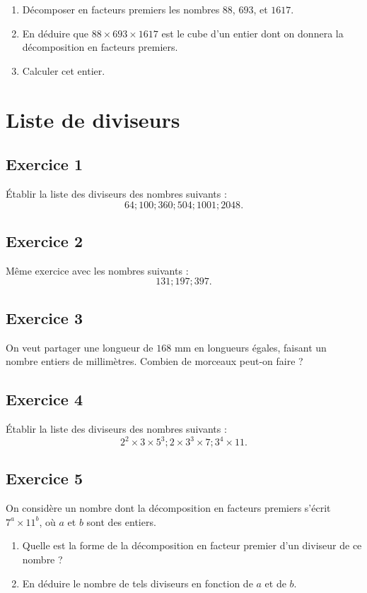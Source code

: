 \documentclass[12 pt]{article}
\theoremstyle{plain}
\newcounter{n}
\numberwithin{n}{section}
\begin{document}
\begin{enumerate}
\item Décomposer en facteurs premiers les nombres $88$, $693$, et 
$1 617$. 
\item En déduire que $88 \times 693 \times 1 617$ est le cube d'un entier dont on donnera la décomposition en facteurs premiers. 
\item Calculer cet entier.
\end{enumerate}


\section*{Liste de diviseurs}
\subsection*{Exercice 1}
Établir la liste des diviseurs des nombres suivants : 
\[ 64 ; 100 ; 360 ; 504 ; 1 001 ; 2 048.\]

\subsection*{Exercice 2}

Même exercice avec les nombres suivants : 
\[ 131 ; 197 ; 397.\]

\subsection*{Exercice 3}


On veut partager une longueur de $168$ mm en longueurs égales, faisant un nombre entiers de millimètres. Combien de morceaux peut-on faire ? 

\subsection*{Exercice 4}

Établir la liste des diviseurs des nombres suivants : 
\[ 2^2 \times 3 \times 5^3  ; 2 \times 3^3 \times 7 ; 3^4 \times 11.\]

\subsection*{Exercice 5}

On considère un nombre dont la décomposition en facteurs premiers s'écrit $7^a \times 11^b$, où $a$ et $b$ sont des entiers. 
\begin{enumerate}
\item Quelle est la forme de la décomposition en facteur premier d'un diviseur de ce nombre ? 
\item En déduire le nombre de tels diviseurs en fonction de $a$ et de $b$. 
\end{enumerate}
\end{document}
